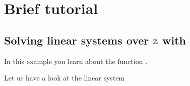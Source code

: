 \section{Brief tutorial}

\subsection{Solving linear systems over $\mathbb Z$ with }

In this example you learn about the function %
.

Let us have a look at the linear system
